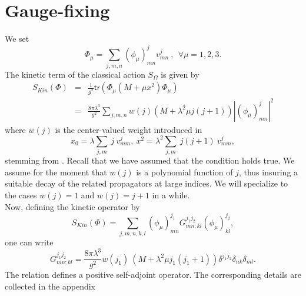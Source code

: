 \documentclass[10pt]{book}
\newcommand{\tr}{\mathsf{tr}}
\theoremstyle{break}
\begin{document}
\section{Gauge-fixing}


We set%
%
\begin{equation}
\Phi_\mu = \sum_{j,m,n} (\phi_\mu)^j_{mn} v^j_{mn} \ , \ \ \forall \mu=1,2,3.
\end{equation}
%
The kinetic term of the classical action %
$S_\Omega$ is given by%
%
\begin{eqnarray}
S_{Kin}(\Phi) &=& \frac{1}{g^2} \tr( \Phi_\mu (M+\mu x^2) \Phi_\mu)%
\\
&=& \frac{8\pi\lambda^3}{g^2} \sum_{j,m,n} w(j) (M+\lambda^2\mu j(j+1)) |(\phi_\mu)^j_{mn}|^2 %
\end{eqnarray}
%
where $w(j)$ is the center-valued weight introduced in %
\begin{equation}
x_0 = \lambda\sum_{j,m} \ j \ v^j_{mm},\ x^2 = \lambda^2\sum_{j,m} \ j(j+1) \ v^j_{mm},%
\end{equation}
stemming from %
. Recall that we have assumed that the condition %
holds true. We assume for the moment that $w(j)$ is a polynomial function of $j$, thus insuring a suitable decay of the related propagators at large indices. We will specialize to the cases $w(j)=1$ and $w(j)=j+1$ in a while.\\
Now, defining the kinetic operator by
\begin{equation*}
S_{Kin}(\Phi)=\sum_{j,m,n,k,l}(\phi_\mu)^{j_1}_{mn}G^{j_1j_2}_{mn;kl}(\phi_\mu)^{j_2}_{kl},
\end{equation*}
one can write 
%
\begin{equation}
G^{j_1j_2}_{mn;kl} = \frac{8\pi\lambda^3}{g^2} w(j_1) \ \left(M+\lambda^2\mu j_1(j_1+1)\right) \delta^{j_1j_2} \delta_{nk} \delta_{ml}.%
\end{equation}
The relation %
defines a positive self-adjoint operator. The corresponding details are collected in the appendix %
\end{document}
